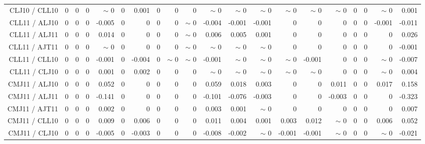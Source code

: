 \begin{table}[H]
\begin{center}
\begin{tabular}{|r|rrrrrrrrrrrrrrrrrr|r|}
CLJ10 / CLL10 &  0 &  0 &  0 &  {\tiny $\sim$ }0 &  0 &      0.001 &  0 &  0 &  0 &  {\tiny $\sim$ }0 &  {\tiny $\sim$ }0 &  {\tiny $\sim$ }0 &  {\tiny $\sim$ }0 &  {\tiny $\sim$ }0 &  {\tiny $\sim$ }0 &  0 &  0 &  {\tiny $\sim$ }0 &      0.001 \\
CLL11 / ALJ10 &  0 &  0 &  0 &     -0.005 &  0 &  0 &  0 &  0 &  {\tiny $\sim$ }0 &     -0.004 &     -0.001 &     -0.001 &  0 &  0 &  0 &  0 &  0 &     -0.001 &     -0.011 \\
CLL11 / ALJ11 &  0 &  0 &  0 &      0.014 &  0 &  0 &  0 &  0 &  {\tiny $\sim$ }0 &      0.006 &      0.005 &      0.001 &  0 &  0 &  0 &  0 &  0 &  0 &      0.026 \\
CLL11 / AJT11 &  0 &  0 &  0 &  {\tiny $\sim$ }0 &  0 &  0 &  0 &  0 &  {\tiny $\sim$ }0 &  {\tiny $\sim$ }0 &  {\tiny $\sim$ }0 &  {\tiny $\sim$ }0 &  0 &  0 &  0 &  0 &  0 &  0 &     -0.001 \\
CLL11 / CLL10 &  0 &  0 &  0 &     -0.001 &  0 &     -0.004 &  0 &  {\tiny $\sim$ }0 &  {\tiny $\sim$ }0 &     -0.001 &  {\tiny $\sim$ }0 &  {\tiny $\sim$ }0 &  {\tiny $\sim$ }0 &     -0.001 &  0 &  0 &  0 &  {\tiny $\sim$ }0 &     -0.007 \\
CLL11 / CLJ10 &  0 &  0 &  0 &      0.001 &  0 &      0.002 &  0 &  0 &  0 &  {\tiny $\sim$ }0 &  {\tiny $\sim$ }0 &  {\tiny $\sim$ }0 &  {\tiny $\sim$ }0 &  {\tiny $\sim$ }0 &  0 &  0 &  0 &  {\tiny $\sim$ }0 &      0.004 \\
CMJ11 / ALJ10 &  0 &  0 &  0 &  \colorbox{Yellow1}{    0.052} &  0 &  0 &  0 &  0 &  0 &  \colorbox{Yellow1}{    0.059} &      0.018 &      0.003 &  0 &  0 &      0.011 &  0 &  0 &      0.017 &  \colorbox{Tomato1}{    0.158} \\
CMJ11 / ALJ11 &  0 &  0 &  0 &     -0.141 &  0 &  0 &  0 &  0 &  0 &     -0.101 &     -0.076 &     -0.003 &  0 &  0 &     -0.003 &  0 &  0 &  0 &     -0.323 \\
CMJ11 / AJT11 &  0 &  0 &  0 &      0.002 &  0 &  0 &  0 &  0 &  0 &      0.003 &      0.001 &  {\tiny $\sim$ }0 &  0 &  0 &  0 &  0 &  0 &  0 &      0.007 \\
CMJ11 / CLL10 &  0 &  0 &  0 &      0.009 &  0 &      0.006 &  0 &  0 &  0 &      0.011 &      0.004 &      0.001 &      0.003 &      0.012 &  {\tiny $\sim$ }0 &  0 &  0 &      0.006 &  \colorbox{Yellow1}{    0.052} \\
CMJ11 / CLJ10 &  0 &  0 &  0 &     -0.005 &  0 &     -0.003 &  0 &  0 &  0 &     -0.008 &     -0.002 &  {\tiny $\sim$ }0 &     -0.001 &     -0.001 &  {\tiny $\sim$ }0 &  0 &  0 &  {\tiny $\sim$ }0 &     -0.021 \\

\end{tabular}
\end{center}
\end{table}
